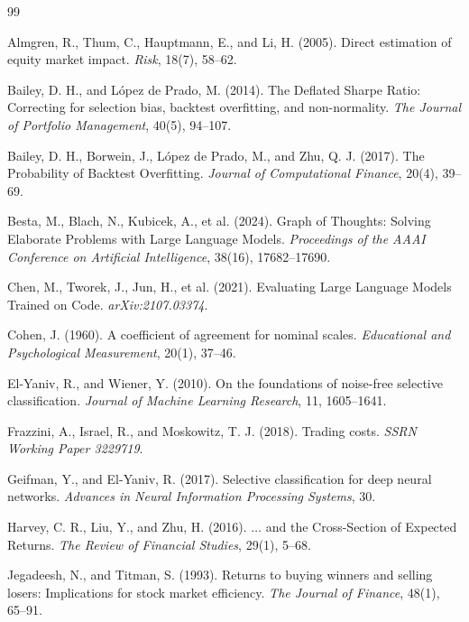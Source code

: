 \documentclass[11pt,a4paper]{article}
\begin{document}
\small
\begin{thebibliography}{99}

Almgren, R., Thum, C., Hauptmann, E., and Li, H. (2005).
Direct estimation of equity market impact. \emph{Risk}, 18(7), 58--62.

Bailey, D. H., and L\'opez de Prado, M. (2014).
The Deflated Sharpe Ratio: Correcting for selection bias, backtest overfitting, and
non-normality. \emph{The Journal of Portfolio Management}, 40(5), 94--107.

Bailey, D. H., Borwein, J., L\'opez de Prado, M., and Zhu, Q. J. (2017).
The Probability of Backtest Overfitting. \emph{Journal of Computational Finance}, 20(4),
39--69.

Besta, M., Blach, N., Kubicek, A., et al. (2024).
Graph of Thoughts: Solving Elaborate Problems with Large Language Models.
\emph{Proceedings of the AAAI Conference on Artificial Intelligence}, 38(16), 17682--17690.

Chen, M., Tworek, J., Jun, H., et al. (2021).
Evaluating Large Language Models Trained on Code. \emph{arXiv:2107.03374}.

Cohen, J. (1960). A coefficient of agreement for nominal scales.
\emph{Educational and Psychological Measurement}, 20(1), 37--46.

El-Yaniv, R., and Wiener, Y. (2010). On the foundations of noise-free selective
classification. \emph{Journal of Machine Learning Research}, 11, 1605--1641.

Frazzini, A., Israel, R., and Moskowitz, T. J. (2018).
Trading costs. \emph{SSRN Working Paper 3229719}.

Geifman, Y., and El-Yaniv, R. (2017). Selective classification for deep neural networks.
\emph{Advances in Neural Information Processing Systems}, 30.

Harvey, C. R., Liu, Y., and Zhu, H. (2016).
$\ldots$ and the Cross-Section of Expected Returns.
\emph{The Review of Financial Studies}, 29(1), 5--68.

Jegadeesh, N., and Titman, S. (1993). Returns to buying winners and selling losers:
Implications for stock market efficiency. \emph{The Journal of Finance}, 48(1), 65--91.


\end{thebibliography}
\end{document}
